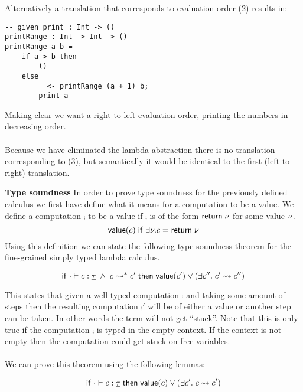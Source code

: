 {Alternatively a translation that corresponds to evaluation order (2) results in:
\begin{verbatim}
-- given print : Int -> ()
printRange : Int -> Int -> ()
printRange a b =
	if a > b then
		()
	else
		_ <- printRange (a + 1) b;
		print a
\end{verbatim}
Making clear we want a right-to-left evaluation order, printing the numbers in decreasing order.
\\\\
Because we have eliminated the lambda abstraction there is no translation corresponding to (3), but semantically it would be identical to the first (left-to-right) translation.

\textbf{Type soundness}
In order to prove type soundness for the previously defined calculus we first have define what it means for a computation to be a value.
We define a computation $\comp$ to be a value if $\comp$ is of the form $\mathsf{return} \; \nu$ for some value $\nu$.
	\[ \mathsf{value}(c) \;\mathsf{if}\; \exists \nu. c = \mathsf{return} \; \nu \]
Using this definition we can state the following type soundness theorem for the fine-grained simply typed lambda calculus.

\begin{theorem}
\[
	\mathsf{if}\;
		\cdot \vdash c : \underline{\tau}
		\;\land\;
		c \rightsquigarrow^* c'
	\;\mathsf{then}\;
		\mathsf{value}(c')
		\lor
		(\exists c''.\; c' \rightsquigarrow c'')
\]
\end{theorem}

This states that given a well-typed computation $\comp$ and taking some amount of steps then the resulting computation $\comp'$ will be of either a value or another step can be taken.
In other words the term will not get ``stuck''.
Note that this is only true if the computation $\comp$ is typed in the empty context.
If the context is not empty then the computation could get stuck on free variables.
\\\\
We can prove this theorem using the following lemmas:

\begin{lemma}[Progress]
\[
	\mathsf{if}\;
		\cdot \vdash c : \underline{\tau}
	\;\mathsf{then}\;
		\mathsf{value}(c)
		\lor
		(\exists c'.\; c \rightsquigarrow c')
\]
\end{lemma}

}
